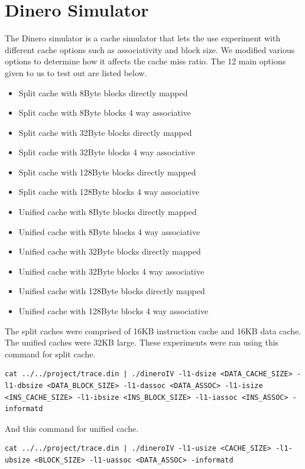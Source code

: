 \documentclass{article}
\begin{document}
    \section{Dinero Simulator}
        The Dinero simulator is a cache simulator that lets the use experiment with different cache options such as associativity and block size. We modified various options to determine how it affects the cache miss ratio. The 12 main options given to us to test out are listed below.
        \begin{itemize}
            \item Split cache with 8Byte blocks directly mapped
            \item Split cache with 8Byte blocks 4 way associative
            \item Split cache with 32Byte blocks directly mapped
            \item Split cache with 32Byte blocks 4 way associative
            \item Split cache with 128Byte blocks directly mapped
            \item Split cache with 128Byte blocks 4 way associative
            \item Unified cache with 8Byte blocks directly mapped
            \item Unified cache with 8Byte blocks 4 way associative
            \item Unified cache with 32Byte blocks directly mapped
            \item Unified cache with 32Byte blocks 4 way associative
            \item Unified cache with 128Byte blocks directly mapped
            \item Unified cache with 128Byte blocks 4 way associative
        \end{itemize}
        The split caches were comprised of 16KB instruction cache and 16KB data cache. The unified caches were 32KB large. These experiments were ran using this command for split cache.
        \begin{lstlisting}
cat ../../project/trace.din | ./dineroIV -l1-dsize <DATA_CACHE_SIZE> -l1-dbsize <DATA_BLOCK_SIZE> -l1-dassoc <DATA_ASSOC> -l1-isize <INS_CACHE_SIZE> -l1-ibsize <INS_BLOCK_SIZE> -l1-iassoc <INS_ASSOC> -informatd
        \end{lstlisting}
        And this command for unified cache.
        \begin{lstlisting}
cat ../../project/trace.din | ./dineroIV -l1-usize <CACHE_SIZE> -l1-ubsize <BLOCK_SIZE> -l1-uassoc <DATA_ASSOC> -informatd
        \end{lstlisting}
\end{document}
